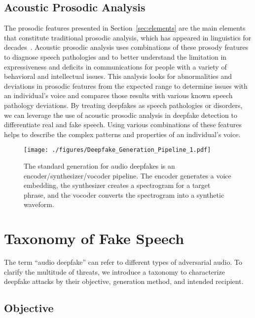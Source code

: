 \documentclass[10pt, journal, anonymous=true]{IEEEtran}
\begin{document}
\subsection{Acoustic Prosodic Analysis}

The prosodic features presented in Section~\ref{sec:elements} are the main elements that constitute traditional prosodic
analysis, which has appeared in linguistics for decades~\cite{voice_quality}. 
Acoustic prosodic analysis uses combinations of these prosody features to diagnose speech pathologies and to better understand the limitation in expressiveness and deficits in communications for people with a variety of behavioral and intellectual issues. This analysis looks for abnormalities and deviations in prosodic features from the expected range to determine issues with an individual's voice and compares those results with various known speech pathology deviations. By treating deepfakes as speech pathologies or disorders, we can leverage the use of acoustic prosodic analysis in deepfake detection to differentiate real and fake speech. Using various combinations of these features helps to describe the complex patterns and properties of an individual's voice. 

\begin{figure}
    \begin{center}
        \texttt{[image: ./figures/Deepfake\_Generation\_Pipeline\_1.pdf]}
        \caption{The standard generation for audio deepfakes is an
        encoder/synthesizer/vocoder pipeline. The encoder
        generates a voice embedding, the synthesizer 
        creates a spectrogram for a target phrase, and the vocoder converts
        the spectrogram into a synthetic waveform.} 
        \label{fig:deepfake_pipeline}
    \end{center}
\end{figure}

\section{Taxonomy of Fake Speech} \label{sec:taxonomy}

The term ``audio deepfake'' can refer to different types of adversarial
audio. To clarify the multitude of threats, we introduce a taxonomy to
characterize deepfake attacks by their objective, generation method,
and intended recipient. 
 

\subsection{Objective} \label{taxonomy_objective}
\end{document}
